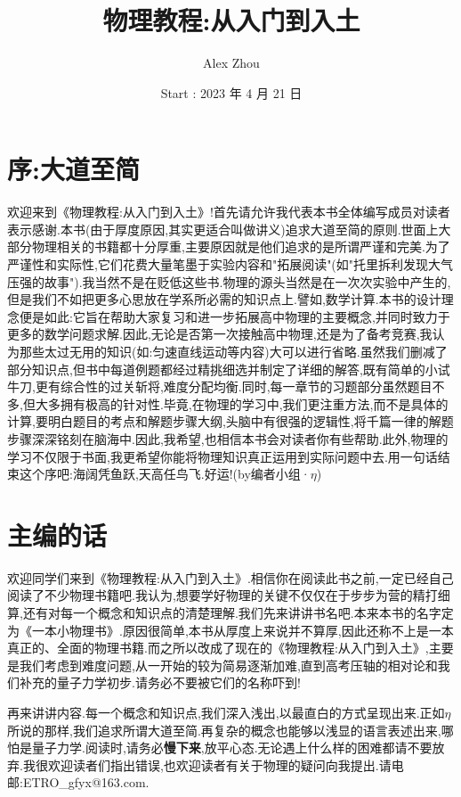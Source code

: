 \documentclass[UTF8,a4paper]{ctexrep}
\title{{\Huge 物理教程:从入门到入土}}
\author{{\large Alex Zhou}}
\date{{\large Start : 2023 年 4 月 21 日}}
\begin{document}
	\maketitle 
	\setcounter{page}{0}
	\section*{序:大道至简}
    欢迎来到《物理教程:从入门到入土》!首先请允许我代表本书全体编写成员对读者表示感谢.本书(由于厚度原因,其实更适合叫做讲义)追求大道至简的原则.世面上大部分物理相关的书籍都十分厚重,主要原因就是他们追求的是所谓严谨和完美.为了严谨性和实际性,它们花费大量笔墨于实验内容和"拓展阅读"(如"托里拆利发现大气压强的故事").我当然不是在贬低这些书.物理的源头当然是在一次次实验中产生的,但是我们不如把更多心思放在学系所必需的知识点上.譬如,数学计算.本书的设计理念便是如此:它旨在帮助大家复习和进一步拓展高中物理的主要概念,并同时致力于更多的数学问题求解.因此,无论是否第一次接触高中物理,还是为了备考竞赛,我认为那些太过无用的知识(如:匀速直线运动等内容)大可以进行省略.虽然我们删减了部分知识点,但书中每道例题都经过精挑细选并制定了详细的解答,既有简单的小试牛刀,更有综合性的过关斩将,难度分配均衡.同时,每一章节的习题部分虽然题目不多,但大多拥有极高的针对性.毕竟,在物理的学习中,我们更注重方法,而不是具体的计算,要明白题目的考点和解题步骤大纲,头脑中有很强的逻辑性,将千篇一律的解题步骤深深铭刻在脑海中.因此,我希望,也相信本书会对读者你有些帮助.此外,物理的学习不仅限于书面,我更希望你能将物理知识真正运用到实际问题中去.用一句话结束这个序吧:海阔凭鱼跃,天高任鸟飞.好运!(by编者小组·$\eta$)
	\section*{主编的话}
	欢迎同学们来到《物理教程:从入门到入土》.相信你在阅读此书之前,一定已经自己阅读了不少物理书籍吧.我认为,想要学好物理的关键不仅仅在于步步为营的精打细算,还有对每一个概念和知识点的清楚理解.我们先来讲讲书名吧.本来本书的名字定为《一本小物理书》.原因很简单,本书从厚度上来说并不算厚,因此还称不上是一本真正的、全面的物理书籍.而之所以改成了现在的《物理教程:从入门到入土》,主要是我们考虑到难度问题,从一开始的较为简易逐渐加难,直到高考压轴的相对论和我们补充的量子力学初步.请务必不要被它们的名称吓到!


	再来讲讲内容.每一个概念和知识点,我们深入浅出,以最直白的方式呈现出来.正如$\eta$所说的那样,我们追求所谓大道至简.再复杂的概念也能够以浅显的语言表述出来,哪怕是量子力学.阅读时,请务必\textbf{慢下来},放平心态.无论遇上什么样的困难都请不要放弃.我很欢迎读者们指出错误,也欢迎读者有关于物理的疑问向我提出.请电邮:ETRO\_gfyx@163.com. 
\end{document}
